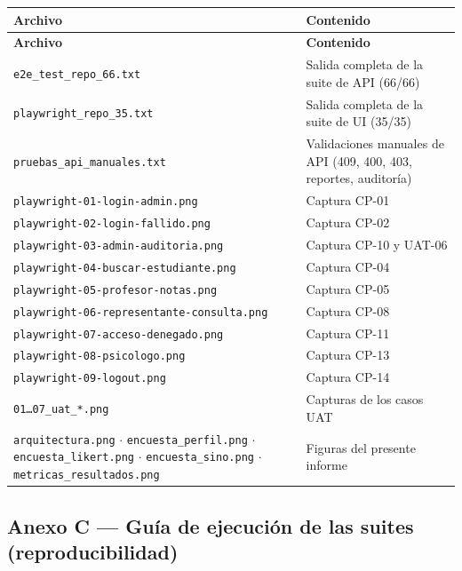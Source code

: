 \documentclass[11pt,a4paper]{article}
\begin{document}
{\small
\begin{longtable}{|p{}|p{}|}
\rowcolor{UTECblue}\color{white}\bfseries Archivo & \color{white}\bfseries Contenido \\ \hline
\endfirsthead
\rowcolor{UTECblue}\color{white}\bfseries Archivo & \color{white}\bfseries Contenido \\ \hline
\endhead
\texttt{e2e\_test\_repo\_66.txt} & Salida completa de la suite de API (66/66) \\ \hline
\texttt{playwright\_repo\_35.txt} & Salida completa de la suite de UI (35/35) \\ \hline
\texttt{pruebas\_api\_manuales.txt} & Validaciones manuales de API (409, 400, 403, reportes, auditoría) \\ \hline
\texttt{playwright-01-login-admin.png} & Captura CP-01 \\ \hline
\texttt{playwright-02-login-fallido.png} & Captura CP-02 \\ \hline
\texttt{playwright-03-admin-auditoria.png} & Captura CP-10 y UAT-06 \\ \hline
\texttt{playwright-04-buscar-estudiante.png} & Captura CP-04 \\ \hline
\texttt{playwright-05-profesor-notas.png} & Captura CP-05 \\ \hline
\texttt{playwright-06-representante-consulta.png} & Captura CP-08 \\ \hline
\texttt{playwright-07-acceso-denegado.png} & Captura CP-11 \\ \hline
\texttt{playwright-08-psicologo.png} & Captura CP-13 \\ \hline
\texttt{playwright-09-logout.png} & Captura CP-14 \\ \hline
\texttt{01{\ldots}07\_uat\_*.png} & Capturas de los casos UAT \\ \hline
\texttt{arquitectura.png} {$\cdot$} \texttt{encuesta\_perfil.png} {$\cdot$} \texttt{encuesta\_likert.png} {$\cdot$} \texttt{encuesta\_sino.png} {$\cdot$} \texttt{metricas\_resultados.png} & Figuras del presente informe \\ \hline
\end{longtable}}


\subsection*{Anexo C --- Guía de ejecución de las suites (reproducibilidad)}
\end{document}
